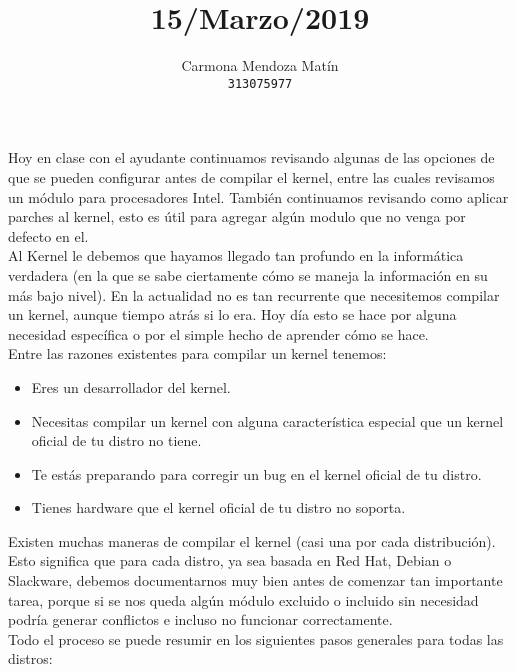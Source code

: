 \documentclass[11pt, a4paper]{report}
\begin{document}
\title{15/Marzo/2019}
\author{
  Carmona Mendoza Mat\'in\\
  \texttt{313075977}
}
\date{}
\maketitle

Hoy en clase con el ayudante continuamos revisando algunas de las opciones de
que se pueden configurar antes de compilar el kernel, entre las cuales
revisamos un módulo para procesadores Intel. También continuamos revisando como
aplicar parches al kernel, esto es útil para agregar algún modulo que no venga
por defecto en el. \\

Al Kernel le debemos que hayamos llegado tan profundo en la informática
verdadera (en la que se sabe ciertamente cómo se maneja la información en su
más bajo nivel). En la actualidad no es tan recurrente que necesitemos compilar
un kernel, aunque tiempo atrás si lo era. Hoy día esto se hace por alguna
necesidad específica o por el simple hecho de aprender cómo se hace. \\

Entre las razones existentes para compilar un kernel tenemos:

\begin{itemize}
\item Eres un desarrollador del kernel.
\item Necesitas compilar un kernel con alguna característica especial que un
  kernel oficial de tu distro no tiene.
\item Te estás preparando para corregir un bug en el kernel oficial de tu
  distro.
\item Tienes hardware que el kernel oficial de tu distro no soporta.
\end{itemize}

Existen muchas maneras de compilar el kernel (casi una por cada distribución).
Esto significa que para cada distro, ya sea basada en Red Hat, Debian o
Slackware, debemos documentarnos muy bien antes de comenzar tan importante
tarea, porque si se nos queda algún módulo excluido o incluido sin necesidad
podría generar conflictos e incluso no funcionar correctamente. \\

Todo el proceso se puede resumir en los siguientes pasos generales para todas
las distros:
\end{document}
